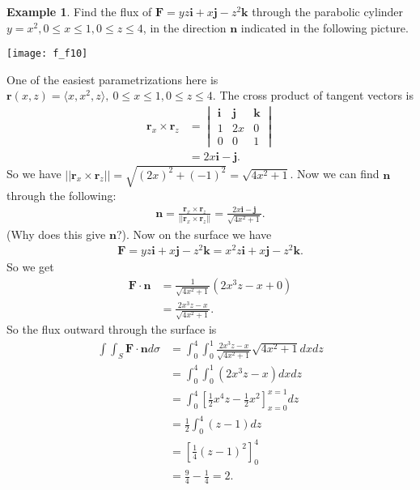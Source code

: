 \documentclass[12pt, letter]{article}
\theoremstyle{plain}
\numberwithin{theorem}{section}
\theoremstyle{definition}
\newtheorem{example}[theorem]{Example}
\begin{document}
\begin{example}
Find the flux of $\bm{F} = yz\bm{i}+x\bm{j}-z^2\bm{k}$ through the parabolic cylinder $y=x^2, 0 \leq x \leq 1, 0\leq z\leq 4$, in the direction $\bm{n}$ indicated in the following picture.

\bigskip

\begin{center}
\texttt{[image: f\_f10]}
\end{center}

\bigskip

One of the easiest parametrizations here is $\bm{r}(x,z) = \langle x,x^2,z\rangle, \ 0\leq x\leq 1, 0\leq z\leq 4$. The cross product of tangent vectors is
\begin{align*}
\bm{r}_x \times \bm{r}_z &= \begin{vmatrix} \bm{i} & \bm{j} & \bm{k} \\ 1 & 2x & 0 \\ 0 & 0 & 1 \end{vmatrix}\\
&= 2x\bm{i}-\bm{j}.
\end{align*}
So we have $||\bm{r}_x\times \bm{r}_z|| = \sqrt{(2x)^2+(-1)^2} = \sqrt{4x^2+1}$. Now we can find $\bm{n}$ through the following:
\begin{align*}
\bm{n} = \frac{\bm{r}_x\times \bm{r}_z}{||\bm{r}_x\times \bm{r}_z||} = \frac{2x\bm{i}-\bm{j}}{\sqrt{4x^2+1}}.
\end{align*}
(Why does this give $\bm{n}$?). Now on the surface we have
\begin{align*}
\bm{F} = yz\bm{i}+x\bm{j}-z^2\bm{k}=x^2z\bm{i}+x\bm{j}-z^2\bm{k}.
\end{align*}
So we get
\begin{align*}
\bm{F}\cdot\bm{n} &= \frac{1}{\sqrt{4x^2+1}} \left(2x^3z-x+0\right)\\
&= \frac{2x^3z-x}{\sqrt{4x^2+1}}.
\end{align*}
So the flux outward through the surface is
\begin{align*}
\int\int_S \bm{F}\cdot\bm{n}d\sigma &= \int_0^4 \int_0^1 \frac{2x^3z-x}{\sqrt{4x^2+1}} \sqrt{4x^2+1}dxdz\\
&= \int_0^4\int_0^1(2x^3z-x)dxdz\\
&= \int_0^4 \left[\frac{1}{2}x^4z-\frac{1}{2}x^2\right]_{x=0}^{x=1}dz\\
&= \frac{1}{2} \int_0^4 (z-1)dz\\
&= \left[\frac{1}{4}(z-1)^2\right]_0^4\\
&= \frac{9}{4}-\frac{1}{4} = 2.
\end{align*}
\end{example}
\end{document}
